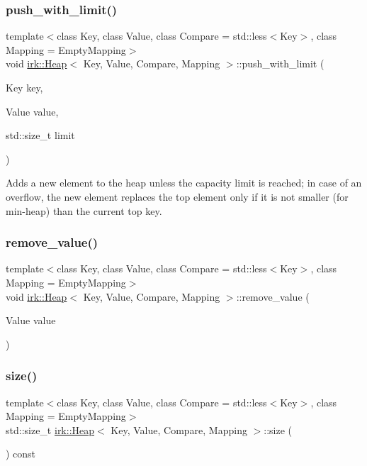 \subsubsection{\texorpdfstring{push\+\_\+with\+\_\+limit()}{push\_with\_limit()}}
{\footnotesize\ttfamily template$<$class Key, class Value, class Compare = std\+::less$<$\+Key$>$, class Mapping = Empty\+Mapping$>$ \\
void \mbox{\hyperlink{classirk_1_1Heap}{irk\+::\+Heap}}$<$ Key, Value, Compare, Mapping $>$\+::push\+\_\+with\+\_\+limit (\begin{DoxyParamCaption}\item[{Key}]{key,  }\item[{Value}]{value,  }\item[{std\+::size\+\_\+t}]{limit }\end{DoxyParamCaption})\hspace{0.3cm}{\ttfamily [inline]}}

Adds a new element to the heap unless the capacity limit is reached; in case of an overflow, the new element replaces the top element only if it is not smaller (for min-\/heap) than the current top key. \mbox{\label{classirk_1_1Heap_a224c213a1e7bf8a073b39ac52659285c}} 
\subsubsection{\texorpdfstring{remove\+\_\+value()}{remove\_value()}}
{\footnotesize\ttfamily template$<$class Key, class Value, class Compare = std\+::less$<$\+Key$>$, class Mapping = Empty\+Mapping$>$ \\
void \mbox{\hyperlink{classirk_1_1Heap}{irk\+::\+Heap}}$<$ Key, Value, Compare, Mapping $>$\+::remove\+\_\+value (\begin{DoxyParamCaption}\item[{Value}]{value }\end{DoxyParamCaption})\hspace{0.3cm}{\ttfamily [inline]}}

\mbox{\label{classirk_1_1Heap_ac917debc1615139f885ac1c699cad6de}} 
\subsubsection{\texorpdfstring{size()}{size()}}
{\footnotesize\ttfamily template$<$class Key, class Value, class Compare = std\+::less$<$\+Key$>$, class Mapping = Empty\+Mapping$>$ \\
std\+::size\+\_\+t \mbox{\hyperlink{classirk_1_1Heap}{irk\+::\+Heap}}$<$ Key, Value, Compare, Mapping $>$\+::size (\begin{DoxyParamCaption}{ }\end{DoxyParamCaption}) const\hspace{0.3cm}{\ttfamily [inline]}}

